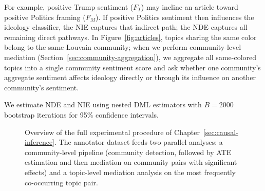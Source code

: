 For example, positive Trump sentiment ($F_T$) may incline an article toward positive Politics framing ($F_M$). If positive Politics sentiment then influences the ideology classifier, the NIE captures that indirect path; the NDE captures all remaining direct pathways. In Figure~\ref{fig:articles}, topics sharing the same color belong to the same Louvain community; when we perform community-level mediation (Section~\ref{sec:community-aggregation}), we aggregate all same-colored topics into a single community sentiment score and ask whether one community's aggregate sentiment affects ideology directly or through its influence on another community's sentiment.

We estimate NDE and NIE using nested DML estimators with $B = \num{2000}$ bootstrap iterations for 95\% confidence intervals.


\begin{figure}[ht!]
  \centering
  \caption{Overview of the full experimental procedure of Chapter~\ref{sec:causal-inference}. The annotator dataset feeds two parallel analyses: a community-level pipeline (community detection, followed by ATE estimation and then mediation on community pairs with significant effects) and a topic-level mediation analysis on the most frequently co-occurring topic pair.}
  \label{fig:experimental-procedure}
\end{figure}


